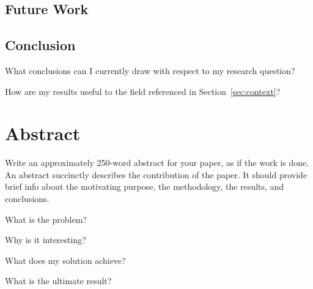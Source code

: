 \documentclass[oneside]{article} %
\begin{document}

\subsection{Future Work}
\label{sec:future}




\subsection{Conclusion}
\label{sec:conclusion}
What conclusions can I currently draw with respect to my research question? 
\qbox

How are my results useful to the field referenced in Section~\ref{sec:context}? 
\qbox


\section{Abstract}
\label{sec:abs}
Write an approximately 250-word abstract for your paper, as if the work is done. An abstract succinctly describes the contribution of the paper. It should provide brief info about the motivating purpose, the methodology, the results, and conclusions.
\begin{compactlist}
\item What is the problem?
\item Why is it interesting?
\item What does my solution achieve?
\item What is the ultimate result?
\end{compactlist}
\end{document}
